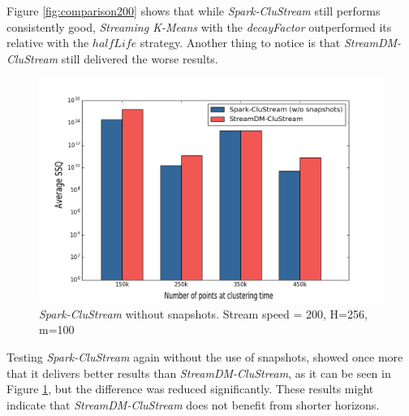 Figure \ref{fig:comparison200} shows that while \textit{Spark-CluStream} still performs consistently good, \textit{Streaming K-Means} with the \textit{decayFactor} outperformed its relative with the $halfLife$ strategy. Another thing to notice is that \textit{StreamDM-CluStream} still delivered the worse results. 

\begin{figure}[h]
 \centering
 \includegraphics[scale=0.35]{./styles/comparisonNoSnaps2.png}
 \caption{\textit{Spark-CluStream} without snapshots. Stream speed = 200, H=256, m=100}
 \label{fig:comparisonNoSnaps2}
\end{figure}

Testing \textit{Spark-CluStream} again without the use of snapshots, showed once more that it delivers better results than \textit{StreamDM-CluStream}, as it can be seen in Figure \ref{fig:comparisonNoSnaps2}, but the difference was reduced significantly. These results might indicate that \textit{StreamDM-CluStream} does not benefit from shorter horizons.